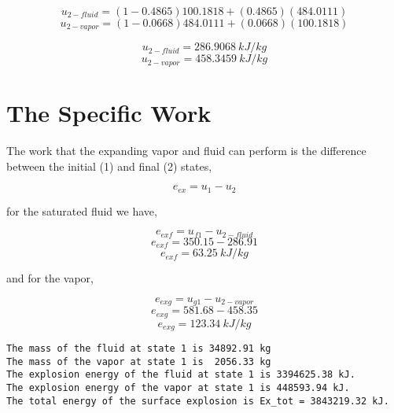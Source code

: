 \documentclass[10pt,parskip=half,
toc=sectionentrywithdots,
bibliography=totocnumbered,
captions=tableheading,numbers=noendperiod]{scrartcl}
\begin{document}
\begin{equation}u_{2-fluid} = (1-0.4865)100.1818 + (0.4865)(484.0111)\end{equation}
\begin{equation}u_{2-vapor} = (1-0.0668)484.0111 + (0.0668)(100.1818)\end{equation}

\begin{equation}u_{2-fluid} = 286.9068\:kJ/kg\end{equation}
\begin{equation}u_{2-vapor} = 458.3459\:kJ/kg\end{equation}

\hypertarget{the-specific-work}{%
\section{The Specific Work}\label{the-specific-work}}

The work that the expanding vapor and fluid can perform is the
difference between the initial (1) and final (2) states,

\begin{equation}e_{ex} = u_1 - u_2\end{equation}

for the saturated fluid we have,

\begin{equation}e_{exf} = u_{f1} - u_{2-fluid}\end{equation}
\begin{equation}e_{exf} = 350.15 - 286.91\end{equation}
\begin{equation}e_{exf} = 63.25\:kJ/kg\end{equation}

and for the vapor,

\begin{equation}e_{exg} = u_{g1} - u_{2-vapor}\end{equation}
\begin{equation}e_{exg} = 581.68 - 458.35\end{equation}
\begin{equation}e_{exg} = 123.34\:kJ/kg\end{equation}

\begin{lstlisting}[language={},postbreak={},numbers=none,xrightmargin=7pt,belowskip=5pt,aboveskip=5pt,breakindent=0pt]
The mass of the fluid at state 1 is 34892.91 kg
The mass of the vapor at state 1 is  2056.33 kg
The explosion energy of the fluid at state 1 is 3394625.38 kJ.
The explosion energy of the vapor at state 1 is 448593.94 kJ.
The total energy of the surface explosion is Ex_tot = 3843219.32 kJ.

\end{lstlisting}
\end{document}
